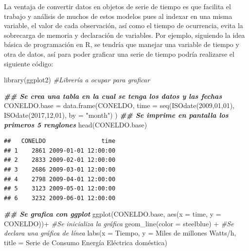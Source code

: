 \documentclass[
  spanish,
]{book}
\newenvironment{Shaded}{\begin{snugshade}}{\end{snugshade}}
\newcommand{\AttributeTok}[1]{\textcolor[rgb]{0.77,0.63,0.00}{#1}}
\newcommand{\CommentTok}[1]{\textcolor[rgb]{0.56,0.35,0.01}{\textit{#1}}}
\newcommand{\DecValTok}[1]{\textcolor[rgb]{0.00,0.00,0.81}{#1}}
\newcommand{\DocumentationTok}[1]{\textcolor[rgb]{0.56,0.35,0.01}{\textbf{\textit{#1}}}}
\newcommand{\FunctionTok}[1]{\textcolor[rgb]{0.00,0.00,0.00}{#1}}
\newcommand{\NormalTok}[1]{#1}
\newcommand{\OtherTok}[1]{\textcolor[rgb]{0.56,0.35,0.01}{#1}}
\newcommand{\SpecialCharTok}[1]{\textcolor[rgb]{0.00,0.00,0.00}{#1}}
\newcommand{\StringTok}[1]{\textcolor[rgb]{0.31,0.60,0.02}{#1}}
\theoremstyle{remark}
\begin{document}
La ventaja de convertir datos en objetos de serie de tiempo es que facilita el trabajo y análisis de muchos de estos modelos pues al indexar en una misma variable, el valor de cada observación, así como el tiempo de ocurrencia, evita la sobrecarga de memoria y declaración de variables. Por ejemplo, siguiendo la idea básica de programación en R, se tendría que manejar una variable de tiempo y otra de datos, así para poder graficar una serie de tiempo podría realizarse el siguiente código:

\begin{Shaded}
\begin{Highlighting}[]
\FunctionTok{library}\NormalTok{(ggplot2) }\CommentTok{\#Librería a ocupar para graficar}

\DocumentationTok{\#\# Se crea una tabla en la cual se tenga los datos y las fechas}
\NormalTok{CONELDO.base }\OtherTok{=} \FunctionTok{data.frame}\NormalTok{(CONELDO, }
                          \AttributeTok{time =} \FunctionTok{seq}\NormalTok{(}\FunctionTok{ISOdate}\NormalTok{(}\DecValTok{2009}\NormalTok{,}\DecValTok{01}\NormalTok{,}\DecValTok{01}\NormalTok{), }
                                     \FunctionTok{ISOdate}\NormalTok{(}\DecValTok{2017}\NormalTok{,}\DecValTok{12}\NormalTok{,}\DecValTok{01}\NormalTok{),}
                                     \AttributeTok{by =} \StringTok{"month"}\NormalTok{) }
\NormalTok{                          )}
\DocumentationTok{\#\# Se imprime en pantalla los primeros 5 renglones}
\FunctionTok{head}\NormalTok{(CONELDO.base)}
\end{Highlighting}
\end{Shaded}

\begin{verbatim}
##   CONELDO                time
## 1    2861 2009-01-01 12:00:00
## 2    2833 2009-02-01 12:00:00
## 3    2686 2009-03-01 12:00:00
## 4    2798 2009-04-01 12:00:00
## 5    3123 2009-05-01 12:00:00
## 6    3232 2009-06-01 12:00:00
\end{verbatim}

\begin{Shaded}
\begin{Highlighting}[]
\DocumentationTok{\#\# Se grafica con ggplot}
\FunctionTok{ggplot}\NormalTok{(CONELDO.base, }\FunctionTok{aes}\NormalTok{(}\AttributeTok{x =}\NormalTok{ time, }\AttributeTok{y =}\NormalTok{ CONELDO))}\SpecialCharTok{+} \CommentTok{\#Se inicializa la gráfica}
  \FunctionTok{geom\_line}\NormalTok{(}\AttributeTok{color =} \StringTok{\textquotesingle{}steelblue\textquotesingle{}}\NormalTok{) }\SpecialCharTok{+} \CommentTok{\#Se declara una gráfica de línea}
  \FunctionTok{labs}\NormalTok{(}\AttributeTok{x =} \StringTok{\textquotesingle{}Tiempo\textquotesingle{}}\NormalTok{, }\AttributeTok{y =} \StringTok{\textquotesingle{}Miles de millones Watts/h\textquotesingle{}}\NormalTok{, }
        \AttributeTok{title =} \StringTok{\textquotesingle{}Serie de Consumo Energía Eléctrica doméstica\textquotesingle{}}\NormalTok{)}
\end{Highlighting}
\end{Shaded}
\end{document}
